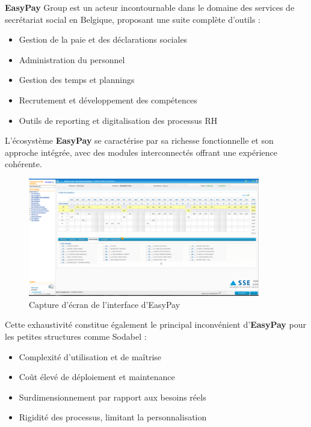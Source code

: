 \newpage
\noindent \textbf{EasyPay} Group est un acteur incontournable dans le domaine des services de secrétariat social en Belgique, proposant une suite complète d'outils :

\begin{itemize}[leftmargin=*,label=\textcolor{darkgray}{$\bullet$},itemsep=0.3em]
  \item Gestion de la paie et des déclarations sociales
  \item Administration du personnel
  \item Gestion des temps et plannings
  \item Recrutement et développement des compétences
  \item Outils de reporting et digitalisation des processus RH
\end{itemize}

\noindent L'écosystème \textbf{EasyPay} se caractérise par sa richesse fonctionnelle et son approche intégrée, avec des modules interconnectés offrant une expérience cohérente.

\begin{figure}[H]
    \centering
    \includegraphics[width=0.9\textwidth]{easyPayScreenshot.png}
    \caption{Capture d'écran de l'interface d'EasyPay \cite{easypay}}
    \label{fig:easyPayScreenshot}
\end{figure}

\begin{tcolorbox}[
  title={\textbf{Limites pour les petites structures}},
  colback=blue!5!white,
  colframe=primarycolor,
  fonttitle=\bfseries,
  boxrule=0.5mm,
  arc=2mm,
  left=6mm,
  right=6mm,
  top=6mm,
  bottom=6mm
]
\noindent Cette exhaustivité constitue également le principal inconvénient d'\textbf{EasyPay} pour les petites structures comme Sodabel :
\begin{itemize}[leftmargin=*,label=\textcolor{darkgray}{$\bullet$},itemsep=0.3em]
  \item Complexité d'utilisation et de maîtrise
  \item Coût élevé de déploiement et maintenance
  \item Surdimensionnement par rapport aux besoins réels
  \item Rigidité des processus, limitant la personnalisation
\end{itemize}
\end{tcolorbox}

